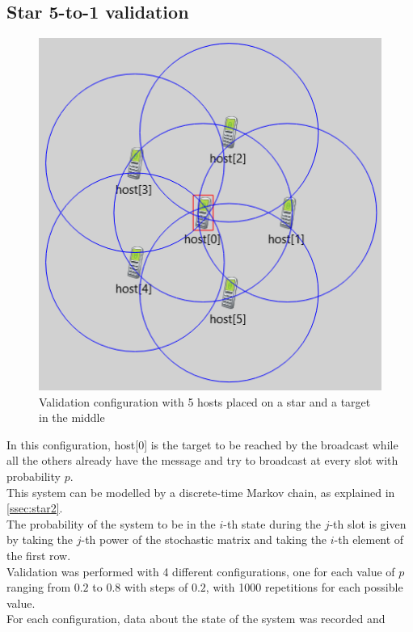 \subsection{Star 5-to-1 validation}
\begin{figure}
	\includegraphics[width=1\linewidth]{img/omnetStar5to1.png} 
	\caption{Validation configuration with 5 hosts placed on a star and a target in the middle}
	\label{fig:star5to1GUI}
\end{figure}
In this configuration, host[0] is the target to be reached by the broadcast
while all the others already have the message and try to broadcast at every
slot with probability $p$.\\
This system can be modelled by a discrete-time Markov chain, as explained in
\ref{ssec:star2}.\\
The probability of the system to be in the $i$-th state during the $j$-th slot
is given by taking the $j$-th power of the stochastic matrix and taking the
$i$-th element of the first row.\\
Validation was performed with 4 different configurations, one for each value of
$p$ ranging from $0.2$ to $0.8$ with steps of $0.2$, with 1000 repetitions for
each possible value.\\
For each configuration, data about the state of the system was recorded and
